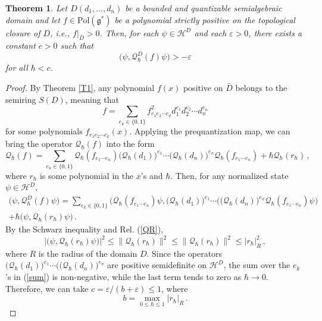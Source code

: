 \documentclass[10pt,a4paper]{amsart}
\newtheorem{theorem}{Theorem}
\newcommand{\gs}{\mathfrak{g}^\ast}
\newcommand{\hh}{\mathcal{H}}
\newcommand{\qq}{\mathcal{Q}_{\hbar}}
\begin{document}
\begin{theorem}Let $D(d_1,\ldots,d_n)$ be a bounded and quantizable semialgebraic  domain and let $f\in \mathrm{Pol}(\gs)$ be a polynomial strictly positive on the topological closure of 
$D$, i.e., $f|_{\bar D}>0$.  Then, for each $\psi \in \hh^D$ and each $\varepsilon>0$, there exists a constant $c>0$ such  that 
   $$
   \big(\psi, \qq^D(f)\psi\big) >-\varepsilon 
   $$
   for all $\hbar<c$. 
\end{theorem}

\begin{proof}
By Theorem \ref{T1}, any polynomial $f(x)$ positive on $\bar D$ belongs to the semiring $S(D)$, meaning that 
\begin{equation}
    f=\sum_{e_k\in \{0,1\}} f^2_{e_1e_2\cdots e_d}d_1^{e_1}d_2^{e_2}\cdots d_n^{e_n}
\end{equation}
for some polynomials $f_{e_1e_2\cdots e_k}(x)$. Applying the prequantization map, we can bring the operator $\qq(f)$ into the form
$$
\qq(f)=\sum_{e_k\in \{0,1\}} \qq(f_{e_1\cdots e_n})\big(\qq(d_{1})\big)^{e_1}\cdots \big(\qq(d_n)\big)^{e_n}\qq(f_{e_1\cdots e_n})+\hbar \qq(r_\hbar)\,,
$$
where $r_\hbar$ is some polynomial in the $x$'s and $\hbar$. Then, for any normalized state $\psi\in \hh^D$,
\begin{equation}\label{sum}
\begin{array}{c}
  \displaystyle   \big(\psi, \qq^D(f)\psi\big)=\sum_{e_k\in \{0,1\}} \big(\qq(f_{e_1\cdots e_n})\psi, \big(\qq(d_1)\big)^{e_1}\cdots \big(\big(\qq(d_n)\big)^{e_n}\qq(f_{e_1\cdots e_n})\psi\big) \\[5mm]+\hbar \big(\psi, \qq(r_\hbar)\psi\big)\,.
    \end{array}
\end{equation}
By the Schwarz inequality and Rel. (\ref{QR}), 
\begin{equation}
    \big|\big(\psi,\qq(r_\hbar)\psi\big)\big|^2\leq \|\qq(r_\hbar)\|^2\leq \|\qq(r_\hbar)\|^2\leq |r_\hbar|^2_R\,,
\end{equation}
where $R$ is the radius of the domain $D$. Since the operators $\big(\qq(d_1)\big)^{e_1}\cdots \big(\big(\qq(d_n)\big)^{e_n}$ are positive semidefinite on $\hh^D$, the sum over the $e_k$'s in (\ref{sum}) is non-negative, while the last term tends to zero as $\hbar\rightarrow 0$. Therefore, we can take $c =\varepsilon/(b+\varepsilon) \leq 1$, where
$$
b=\max_{0\leq \hbar\leq 1}|r_\hbar|_R\,.
$$
\end{proof}
\end{document}
